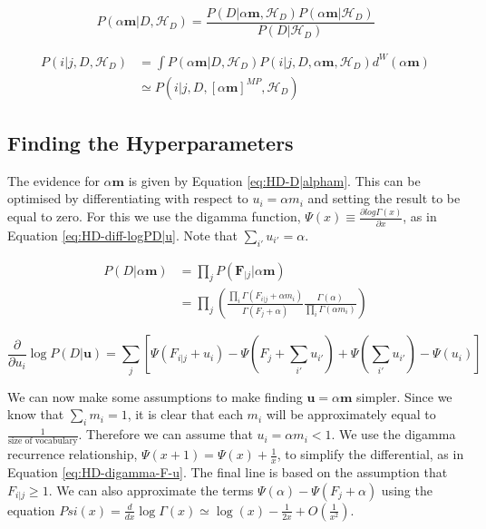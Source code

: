\begin{equation}
P(\alpha\boldsymbol{m}|D,\mathscr{H}_{D})=\frac{P(D|\alpha\boldsymbol{m},\mathscr{H}_{D})P(\alpha\boldsymbol{m}|\mathscr{H}_{D})}{P(D|\mathscr{H}_{D})}
\label{eq:HD-alpham|D-H}
\end{equation}

\begin{align}
P(i|j,D,\mathscr{H}_{D})&=\int P(\alpha\boldsymbol{m}|D,\mathscr{H}_{D})P(i|j,D,\alpha\boldsymbol{m},\mathscr{H}_{D})d^{W}(\alpha\boldsymbol{m}) \nonumber
\\
&\simeq P(i|j,D,[\alpha\boldsymbol{m}]^{MP},\mathscr{H}_{D})
\label{eq:HD-i|j-D-H}
\end{align}

\subsection{Finding the Hyperparameters}

The evidence for $\alpha\boldsymbol{m}$ is given by Equation \ref{eq:HD-D|alpham}. This can be optimised by differentiating with respect to $u_{i}=\alpha m_{i}$ and setting the result to be equal to zero. For this we use the digamma function, $\Psi(x)\equiv\frac{\partial log\Gamma(x)}{\partial x}$, as in Equation \ref{eq:HD-diff-logPD|u}. Note that $\sum_{i'}u_{i'}=\alpha$.

\begin{align}
P(D|\alpha\boldsymbol{m})&=\prod_{j}P(\boldsymbol{F}_{|j}|\alpha\boldsymbol{m}) \nonumber
\\
&=\prod_{j}\left(\frac{\prod_{i}\Gamma(F_{i|j}+\alpha m_{i})}{\Gamma(F_{j}+\alpha)}\frac{\Gamma(\alpha)}{\prod_{i}\Gamma(\alpha m_{i})}\right)
\label{eq:HD-D|alpham}
\end{align}

\begin{equation}
\frac{\partial}{\partial u_{i}}\log P(D|\boldsymbol{u})=\sum_{j}[\Psi(F_{i|j}+u_{i})-\Psi(F_{j}+\sum_{i'}u_{i'})+\Psi(\sum_{i'}u_{i'})-\Psi(u_{i})] 
\label{eq:HD-diff-logPD|u}
\end{equation}

We can now make some assumptions to make finding $\boldsymbol{u}=\alpha\boldsymbol{m}$ simpler. Since we know that $\sum_{i}m_{i}=1$, it is clear that each $m_{i}$ will be approximately equal to $\frac{1}{\text{size of vocabulary}}$. Therefore we can assume that $u_{i}=\alpha m_{i}<1$. We use the digamma recurrence relationship, $\Psi(x+1)=\Psi(x)+\frac{1}{x}$, to simplify the differential, as in Equation \ref{eq:HD-digamma-F-u}. The final line is based on the assumption that $F_{i|j}\geq 1$. We can also approximate the terms $\Psi(\alpha)-\Psi(F_{j}+\alpha)$ using the equation $Psi(x)=\frac{d}{dx}\log\Gamma(x)\simeq\log(x)-\frac{1}{2x}+O(\frac{1}{x^{2}})$.

